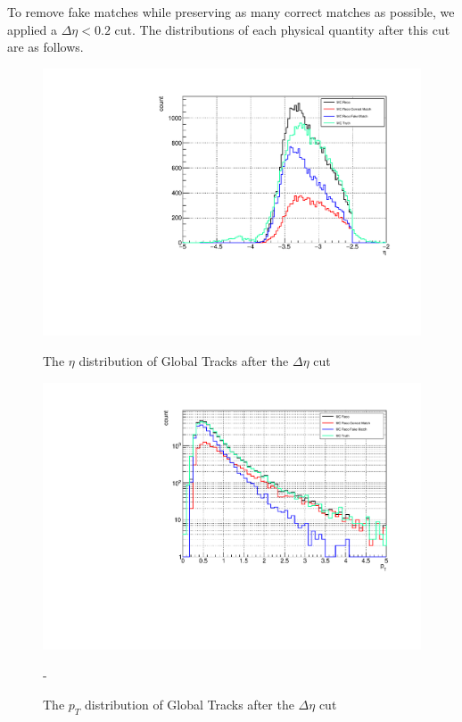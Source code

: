                 To remove fake matches while preserving as many correct matches as possible, we applied a $\Delta \eta < 0.2$ cut. The distributions of each physical quantity after this cut are as follows.
                \begin{figure}[H]
                    \centering
                    \begin{minipage}{0.45\textwidth} %
                        \centering
                        \includegraphics[width=\textwidth]{fig/3_5_6_etacut02_eta.pdf} %
                        \caption{The $\eta$ distribution of Global Tracks after the $\Delta \eta$ cut}
                        \label{Analysis:Matching:afterCut_eta}
                    \end{minipage}
                    \hfill
                    \begin{minipage}{0.45\textwidth}
                        \centering
                        \includegraphics[width=\textwidth]{fig/3_5_6_etacut02_pt.pdf} %
                        \caption{The $p_T$ distribution of Global Tracks after the $\Delta \eta$ cut}
                        \label{Analysis:Matching:afterCut_pt}
                    \end{minipage}-
                \end{figure}

